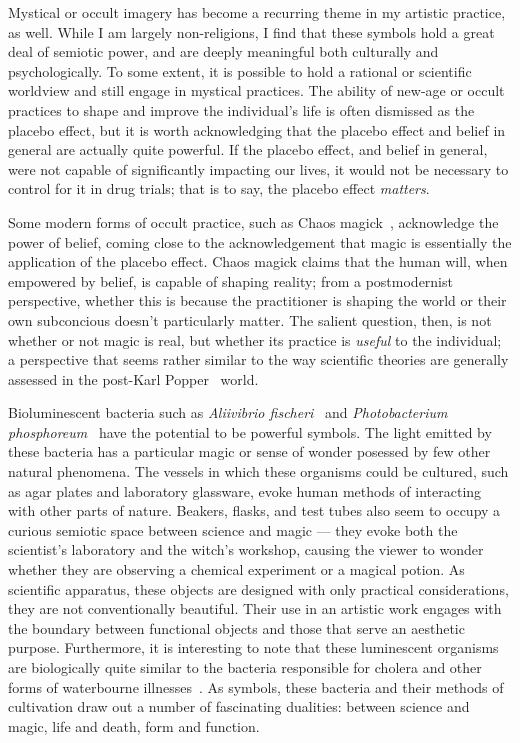 \documentclass[a4paper,nobib]{tufte-handout}
\begin{document}
Mystical or occult imagery has become a recurring theme in my artistic practice, as well. While I am largely non-religions, I find that these symbols hold a great deal of semiotic power, and are deeply meaningful both culturally and psychologically. To some extent, it is possible to hold a rational or scientific worldview and still engage in mystical practices. The ability of new-age or occult practices to shape and improve the individual's life is often dismissed as the placebo effect, but it is worth acknowledging that the placebo effect and belief in general are actually quite powerful. If the placebo effect, and belief in general, were not capable of significantly impacting our lives, it would not be necessary to control for it in drug trials; that is to say, the placebo effect \textit{matters}.

Some modern forms of occult practice, such as Chaos magick~\autocite{carroll1987liber,carroll1992liber,sherwin1992book}, acknowledge the power of belief, coming close to the acknowledgement that magic is essentially the application of the placebo effect. Chaos magick claims that the human will, when empowered by belief, is capable of shaping reality; from a postmodernist perspective, whether this is because the practitioner is shaping the world or their own subconcious doesn't particularly matter. The salient question, then, is not whether or not magic is real, but whether its practice is \textit{useful} to the individual; a perspective that seems rather similar to the way scientific theories are generally assessed in the post-Karl Popper~\autocite{popper1999all} world.

Bioluminescent bacteria such as \textit{Aliivibrio fischeri}~\autocite{brock,dictPhotobacterium} and \textit{Photobacterium phosphoreum}~\autocite{dictPhotobacterium} have the potential to be powerful symbols. The light emitted by these bacteria has a particular magic or sense of wonder posessed by few other natural phenomena. The vessels in which these organisms could be cultured, such as agar plates and laboratory glassware, evoke human methods of interacting with other parts of nature. Beakers, flasks, and test tubes also seem to occupy a curious semiotic space between science and magic --- they evoke both the scientist's laboratory and the witch's workshop, causing the viewer to wonder whether they are observing a chemical experiment or a magical potion. As scientific apparatus, these objects are designed with only practical considerations, they are not conventionally beautiful. Their use in an artistic work engages with the boundary between functional objects and those that serve an aesthetic purpose. Furthermore, it is interesting to note that these luminescent organisms are biologically quite similar to the bacteria responsible for cholera and other forms of waterbourne illnesses~\autocite{dictVibrio}. As symbols, these bacteria and their methods of cultivation draw out a number of fascinating dualities: between science and magic, life and death, form and function.
\end{document}
